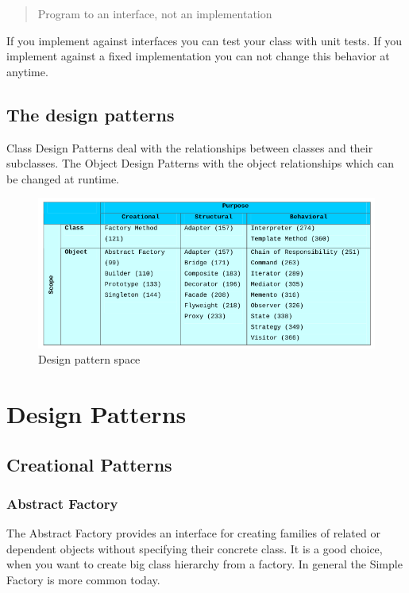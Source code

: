 \documentclass[11pt]{article}
\begin{document}
\begin{quote}
Program to an interface, not an implementation
\end{quote}
If you implement against interfaces you can test your class with unit tests.
If you implement against a fixed implementation you can not change this behavior at anytime.

\subsection{The design patterns}
\label{sec:org567b8d8}

Class Design Patterns deal with the relationships between classes and their subclasses.
The Object Design Patterns with the object relationships which can be changed at runtime.

\begin{figure}[htbp]
\centering
\includegraphics[width=.9\linewidth]{img/design_pattern_space.png}
\caption{\label{fig:design-pattern-space}Design pattern space}
\end{figure}


\section{Design Patterns}
\label{sec:org5a930ff}
\subsection{Creational Patterns}
\label{sec:org59fc60b}
\subsubsection{Abstract Factory}
\label{sec:org087cc6a}
The Abstract Factory provides an interface for creating families of related or dependent objects without specifying their concrete class.
It is a good choice, when you want to create big class hierarchy from a factory.
In general the Simple Factory is more common today.
\end{document}

